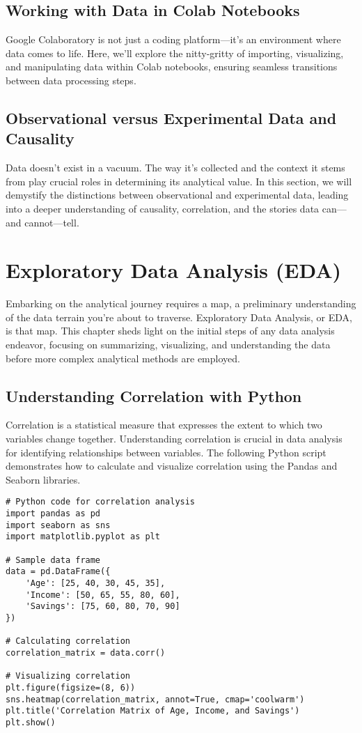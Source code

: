 \documentclass[a4paper,12pt]{book}
\begin{document}
\section{Working with Data in Colab Notebooks}
Google Colaboratory is not just a coding platform—it's an environment where data comes to life. Here, we'll explore the nitty-gritty of importing, visualizing, and manipulating data within Colab notebooks, ensuring seamless transitions between data processing steps.

\section{Observational versus Experimental Data and Causality}
Data doesn't exist in a vacuum. The way it's collected and the context it stems from play crucial roles in determining its analytical value. In this section, we will demystify the distinctions between observational and experimental data, leading into a deeper understanding of causality, correlation, and the stories data can—and cannot—tell.

\chapter{Exploratory Data Analysis (EDA)}
Embarking on the analytical journey requires a map, a preliminary understanding of the data terrain you're about to traverse. Exploratory Data Analysis, or EDA, is that map. This chapter sheds light on the initial steps of any data analysis endeavor, focusing on summarizing, visualizing, and understanding the data before more complex analytical methods are employed.

\section{Understanding Correlation with Python}
Correlation is a statistical measure that expresses the extent to which two variables change together. Understanding correlation is crucial in data analysis for identifying relationships between variables. The following Python script demonstrates how to calculate and visualize correlation using the Pandas and Seaborn libraries.

\begin{verbatim}
# Python code for correlation analysis
import pandas as pd
import seaborn as sns
import matplotlib.pyplot as plt

# Sample data frame
data = pd.DataFrame({
    'Age': [25, 40, 30, 45, 35],
    'Income': [50, 65, 55, 80, 60],
    'Savings': [75, 60, 80, 70, 90]
})

# Calculating correlation
correlation_matrix = data.corr()

# Visualizing correlation
plt.figure(figsize=(8, 6))
sns.heatmap(correlation_matrix, annot=True, cmap='coolwarm')
plt.title('Correlation Matrix of Age, Income, and Savings')
plt.show()
\end{verbatim}
\end{document}
